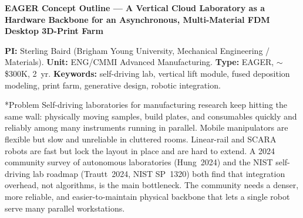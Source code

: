 \documentclass[11pt]{article}
\makeatletter
\renewcommand{\section}{\@startsection{section}{1}{0pt}{1.0ex plus 0.3ex}{0.3ex}{\normalfont\bfseries}}
\makeatother
\begin{document}
\begin{center}
{\bfseries EAGER Concept Outline --- A Vertical Cloud Laboratory as a Hardware Backbone for an Asynchronous, Multi-Material FDM Desktop 3D-Print Farm}
\end{center}

{\small \textbf{PI:} Sterling Baird (Brigham Young University, Mechanical Engineering / Materials). \textbf{Unit:} ENG/CMMI Advanced Manufacturing. \textbf{Type:} EAGER, $\sim$\$300K, 2~yr. \textbf{Keywords:} self-driving lab, vertical lift module, fused deposition modeling, print farm, generative design, robotic integration.}

\section*{Problem}
Self-driving laboratories for manufacturing research keep hitting the same wall: physically moving samples, build plates, and consumables quickly and reliably among many instruments running in parallel. Mobile manipulators are flexible but slow and unreliable in cluttered rooms. Linear-rail and SCARA robots are fast but lock the layout in place and are hard to extend. A 2024 community survey of autonomous laboratories (Hung~2024) and the NIST self-driving lab roadmap (Trautt~2024, NIST SP~1320) both find that integration overhead, not algorithms, is the main bottleneck. The community needs a denser, more reliable, and easier-to-maintain physical backbone that lets a single robot serve many parallel workstations.
\end{document}
